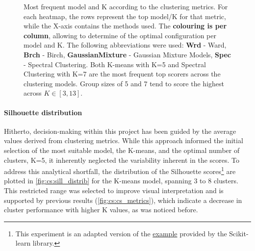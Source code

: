 \begin{figure}[!t]
    \caption[Heatmaps: most common cluster model and $K$]{Most frequent model and K according to the clustering metrics. For each heatmap, the rows represent the top model/K for that metric, while the X-axis contains the methods used. The \textbf{colouring is per column}, allowing to determine of the optimal configuration per model and K. The following abbreviations were used: \textbf{Wrd} - Ward, \textbf{Brch} - Birch, \textbf{GaussianMixture} - Gaussian Mixture Models, \textbf{Spec} - Spectral Clustering. Both K-means with K=5 and Spectral Clustering with K=7 are the most frequent top scorers across the clustering models. Group sizes of 5 and 7 tend to score the highest across $K\in[3,13]$.}
    \label{fig:cs:cs_metrics_heatmap}
\end{figure}



\paragraph*{Silhouette distribution}

Hitherto, decision-making within this project has been guided by the average values derived from clustering metrics. While this approach informed the initial selection of the most suitable model, the K-means, and the optimal number of clusters, K=5, it inherently neglected the variability inherent in the scores. To address this analytical shortfall, the distribution of the Silhouette scores\footnote{This experiment is an adapted version of the \href{https://tinyurl.com/sillhouete-distrib}{example} provided by the Scikit-learn library.} are plotted in \cref{fig:cs:sill_distrib} for the K-means model, spanning 3 to 8 clusters. This restricted range was selected to improve visual interpretation and is supported by previous results (\cref{fig:cs:cs_metrics}), which indicate a decrease in cluster performance with higher K values, as was noticed before.


